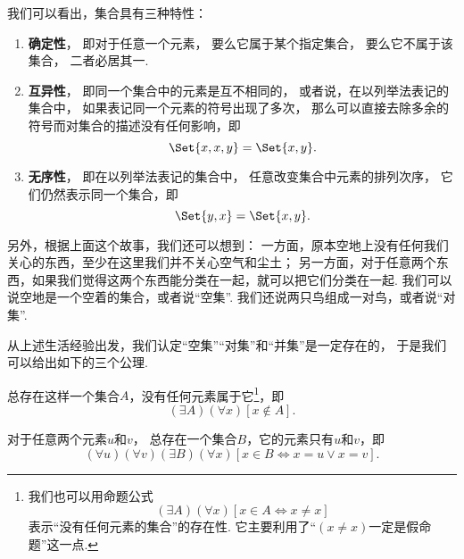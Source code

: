 我们可以看出，集合具有三种特性：
\begin{enumerate}
	\item {\rm\bf 确定性}，
	即对于任意一个元素，
	要么它属于某个指定集合，
	要么它不属于该集合，
	二者必居其一.

	\item {\rm\bf 互异性}，
	即同一个集合中的元素是互不相同的，
	或者说，在以列举法表记的集合中，
	如果表记同一个元素的符号出现了多次，
	那么可以直接去除多余的符号而对集合的描述没有任何影响，即\begin{equation*}
		\Set{ x, x, y } = \Set{ x, y }.
	\end{equation*}

	\item {\rm\bf 无序性}，
	即在以列举法表记的集合中，
	任意改变集合中元素的排列次序，
	它们仍然表示同一个集合，即\begin{equation*}
		\Set{ y, x } = \Set{ x, y }.
	\end{equation*}
\end{enumerate}



另外，根据上面这个故事，我们还可以想到：
一方面，原本空地上没有任何我们关心的东西，至少在这里我们并不关心空气和尘土；
另一方面，对于任意两个东西，如果我们觉得这两个东西能分类在一起，就可以把它们分类在一起.
我们可以说空地是一个空着的集合，或者说“空集”.
我们还说两只鸟组成一对鸟，或者说“对集”.

从上述生活经验出发，我们认定“空集”“对集”和“并集”是一定存在的，
于是我们可以给出如下的三个公理.

\begin{axiom}[空集公理]\label{axiom:集合论.空集公理}
总存在这样一个集合\(A\)，没有任何元素属于它\footnote{%
我们也可以用命题公式\begin{equation*}
	(\exists A)(\forall x)[x \in A \iff x \neq x]
\end{equation*}表示“没有任何元素的集合”的存在性.
它主要利用了“\((x \neq x)\)一定是假命题”这一点.
}，即\begin{equation*}
	(\exists A)(\forall x)[x \notin A].
\end{equation*}
\end{axiom}

\begin{axiom}[对集公理]\label{axiom:集合论.对集公理}
对于任意两个元素\(u\)和\(v\)，
总存在一个集合\(B\)，它的元素只有\(u\)和\(v\)，即\begin{equation*}
	(\forall u)(\forall v)(\exists B)(\forall x)
	[x \in B \iff x = u \lor x = v].
\end{equation*}
\end{axiom}

